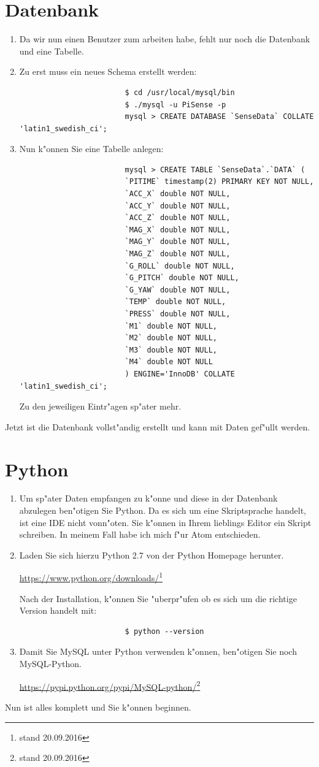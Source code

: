\documentclass[oneside, a4paper, 11pt]{report}
\begin{document}
		\section{Datenbank}
			\begin{enumerate}
				\item[]
					Da wir nun einen Benutzer zum arbeiten habe, fehlt nur noch die Datenbank und eine Tabelle. 
				\item 
					Zu erst muss ein neues Schema erstellt werden:
					\begin{verbatim}
						$ cd /usr/local/mysql/bin
						$ ./mysql -u PiSense -p
						mysql > CREATE DATABASE `SenseData` COLLATE 'latin1_swedish_ci';
					\end{verbatim}
				\item
					Nun k"onnen Sie eine Tabelle anlegen:
					\begin{verbatim}
						mysql > CREATE TABLE `SenseData`.`DATA` (
						`PITIME` timestamp(2) PRIMARY KEY NOT NULL,
						`ACC_X` double NOT NULL,
						`ACC_Y` double NOT NULL,
						`ACC_Z` double NOT NULL,
						`MAG_X` double NOT NULL,
						`MAG_Y` double NOT NULL,
						`MAG_Z` double NOT NULL,
						`G_ROLL` double NOT NULL,
						`G_PITCH` double NOT NULL,
						`G_YAW` double NOT NULL,
						`TEMP` double NOT NULL,
						`PRESS` double NOT NULL,
						`M1` double NOT NULL,
						`M2` double NOT NULL,
						`M3` double NOT NULL,
						`M4` double NOT NULL
						) ENGINE='InnoDB' COLLATE 'latin1_swedish_ci';
					\end{verbatim}
					Zu den jeweiligen Eintr"agen sp"ater mehr.
			\end{enumerate}
			Jetzt ist die Datenbank vollst"andig erstellt und kann mit Daten gef"ullt werden.
		\newpage
		\section{Python}
			\begin{enumerate}
				\item[] 
					Um sp"ater Daten empfangen zu k"onne und diese in der Datenbank abzulegen ben"otigen Sie Python. Da es sich um eine Skriptsprache handelt, ist eine IDE nicht vonn"oten. Sie k"onnen in Ihrem lieblings Editor ein Skript schreiben. In meinem Fall habe ich mich f"ur Atom entschieden.
				\item
					Laden Sie sich hierzu Python 2.7 von der Python Homepage herunter.
					\begin{center}
						\url{https://www.python.org/downloads/}\footnote{stand 20.09.2016}
					\end{center}
					Nach der Installation, k"onnen Sie "uberpr"ufen ob es sich um die richtige Version handelt mit:
					\begin{verbatim}
						$ python --version
					\end{verbatim}
				\item
					Damit Sie MySQL unter Python verwenden k"onnen, ben"otigen Sie noch MySQL-Python.
					\begin{center}
						\url{https://pypi.python.org/pypi/MySQL-python/}\footnote{stand 20.09.2016}
					\end{center}
			\end{enumerate}
			Nun ist alles komplett und Sie k"onnen beginnen.
\end{document}

